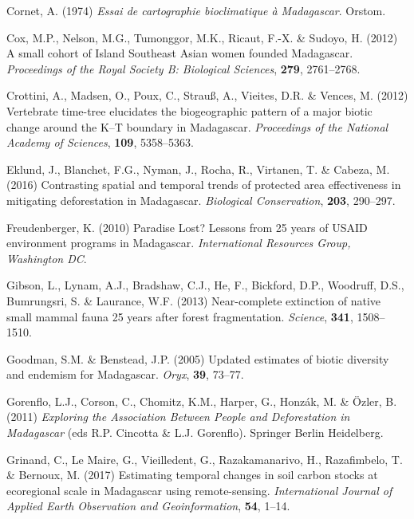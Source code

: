 \documentclass[]{article}
\theoremstyle{definition}
\theoremstyle{definition}
\theoremstyle{definition}
\theoremstyle{remark}
\begin{document}
\leavevmode\hypertarget{ref-Cornet1974}{}%
Cornet, A. (1974) \emph{Essai de cartographie bioclimatique à
Madagascar}. Orstom.

\leavevmode\hypertarget{ref-Cox2012}{}%
Cox, M.P., Nelson, M.G., Tumonggor, M.K., Ricaut, F.-X. \& Sudoyo, H.
(2012) A small cohort of Island Southeast Asian women founded
Madagascar. \emph{Proceedings of the Royal Society B: Biological
Sciences}, \textbf{279}, 2761--2768.

\leavevmode\hypertarget{ref-Crottini2012}{}%
Crottini, A., Madsen, O., Poux, C., Strauß, A., Vieites, D.R. \& Vences,
M. (2012) Vertebrate time-tree elucidates the biogeographic pattern of a
major biotic change around the K--T boundary in Madagascar.
\emph{Proceedings of the National Academy of Sciences}, \textbf{109},
5358--5363.

\leavevmode\hypertarget{ref-Eklund2016}{}%
Eklund, J., Blanchet, F.G., Nyman, J., Rocha, R., Virtanen, T. \&
Cabeza, M. (2016) Contrasting spatial and temporal trends of protected
area effectiveness in mitigating deforestation in Madagascar.
\emph{Biological Conservation}, \textbf{203}, 290--297.

\leavevmode\hypertarget{ref-Freudenberger2010}{}%
Freudenberger, K. (2010) Paradise Lost? Lessons from 25 years of USAID
environment programs in Madagascar. \emph{International Resources Group,
Washington DC}.

\leavevmode\hypertarget{ref-Gibson2013}{}%
Gibson, L., Lynam, A.J., Bradshaw, C.J., He, F., Bickford, D.P.,
Woodruff, D.S., Bumrungsri, S. \& Laurance, W.F. (2013) Near-complete
extinction of native small mammal fauna 25 years after forest
fragmentation. \emph{Science}, \textbf{341}, 1508--1510.

\leavevmode\hypertarget{ref-Goodman2005}{}%
Goodman, S.M. \& Benstead, J.P. (2005) Updated estimates of biotic
diversity and endemism for Madagascar. \emph{Oryx}, \textbf{39}, 73--77.

\leavevmode\hypertarget{ref-Gorenflo2011}{}%
Gorenflo, L.J., Corson, C., Chomitz, K.M., Harper, G., Honzák, M. \&
Özler, B. (2011) \emph{Exploring the Association Between People and
Deforestation in Madagascar} (eds R.P. Cincotta \& L.J. Gorenflo).
Springer Berlin Heidelberg.

\leavevmode\hypertarget{ref-Grinand2017}{}%
Grinand, C., Le Maire, G., Vieilledent, G., Razakamanarivo, H.,
Razafimbelo, T. \& Bernoux, M. (2017) Estimating temporal changes in
soil carbon stocks at ecoregional scale in Madagascar using
remote-sensing. \emph{International Journal of Applied Earth Observation
and Geoinformation}, \textbf{54}, 1--14.
\end{document}
